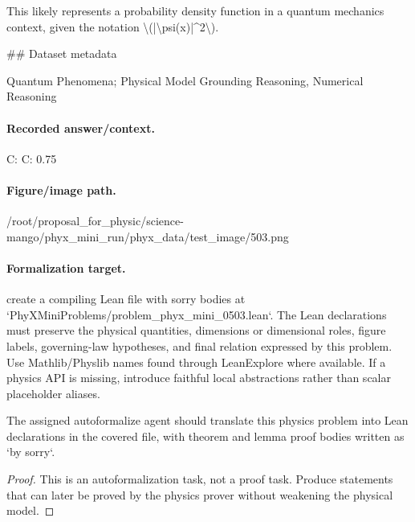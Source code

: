 This likely represents a probability density function in a quantum mechanics context, given the notation \textbackslash{}(|\textbackslash{}psi(x)|\textasciicircum{}2\textbackslash{}).

\#\# Dataset metadata

Quantum Phenomena; Physical Model Grounding Reasoning, Numerical Reasoning

\paragraph{Recorded answer/context.}
C: C: 0.75

\paragraph{Figure/image path.}
/root/proposal\_for\_physic/science-mango/phyx\_mini\_run/phyx\_data/test\_image/503.png

\paragraph{Formalization target.}
create a compiling Lean file with sorry bodies at `PhyXMiniProblems/problem\_phyx\_mini\_0503.lean`. The Lean declarations must preserve the physical quantities, dimensions or dimensional roles, figure labels, governing-law hypotheses, and final relation expressed by this problem.
Use Mathlib/Physlib names found through LeanExplore where available. If a physics API is missing, introduce faithful local abstractions rather than scalar placeholder aliases.

\begin{theorem}
\label{thm:physics:phyx_mini_0503:target}
The assigned autoformalize agent should translate this physics problem into Lean declarations in the covered file, with theorem and lemma proof bodies written as `by sorry`.
\end{theorem}
\begin{proof}
This is an autoformalization task, not a proof task. Produce statements that can later be proved by the physics prover without weakening the physical model.
\end{proof}

